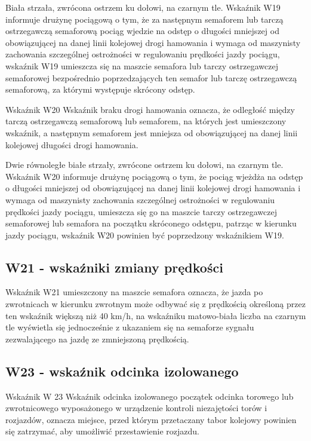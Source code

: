 Biała strzała, zwrócona ostrzem ku dołowi, na czarnym tle. Wskaźnik W19 informuje drużynę pociągową o tym, że za następnym semaforem lub tarczą ostrzegawczą semaforową pociąg wjedzie na odstęp o długości mniejszej od obowiązującej na danej linii kolejowej drogi hamowania i wymaga od maszynisty zachowania szczególnej ostrożności w regulowaniu
prędkości jazdy pociągu, wskaźnik W19 umieszcza się na maszcie semafora lub tarczy ostrzegawczej semaforowej bezpośrednio poprzedzających ten semafor lub tarczę ostrzegawczą semaforową, za którymi występuje skrócony odstęp. 

Wskaźnik W20 {\textquotedbl}Wskaźnik braku drogi hamowania{\textquotedbl} oznacza, że odległość między tarczą ostrzegawczą semaforową lub semaforem, na których jest umieszczony wskaźnik, a następnym semaforem jest mniejsza od obowiązującej na danej linii kolejowej długości drogi hamowania. 

Dwie równoległe białe strzały, zwrócone ostrzem ku dołowi, na czarnym tle. Wskaźnik W20 informuje drużynę pociągową o
tym, że pociąg wjeżdża na odstęp o długości mniejszej od obowiązującej na danej linii kolejowej drogi hamowania i
wymaga od maszynisty zachowania szczególnej ostrożności w regulowaniu prędkości jazdy pociągu, umieszcza się go na
maszcie tarczy ostrzegawczej semaforowej lub semafora na początku skróconego odstępu, patrząc w kierunku jazdy pociągu,
wskaźnik W20 powinien być poprzedzony wskaźnikiem W19.

\subsection{W21 - wskaźniki zmiany prędkości}

Wskaźnik W21 umieszczony na maszcie semafora oznacza, że jazda po zwrotnicach w kierunku zwrotnym może odbywać się z prędkością określoną przez ten  wskaźnik większą niż 40 km/h, na wskaźniku matowo-biała liczba na czarnym tle wyświetla się jednocześnie z ukazaniem się na semaforze sygnału zezwalającego na jazdę ze zmniejszoną prędkością.

\subsection{W23 - wskaźnik odcinka izolowanego}

Wskaźnik W 23 {\textquotedbl}Wskaźnik odcinka izolowanego{\textquotedbl} początek odcinka torowego lub zwrotnicowego
wyposażonego w urządzenie kontroli niezajętości torów i rozjazdów, oznacza miejsce, przed którym przetaczany tabor
kolejowy powinien się zatrzymać, aby umożliwić przestawienie rozjazdu.

